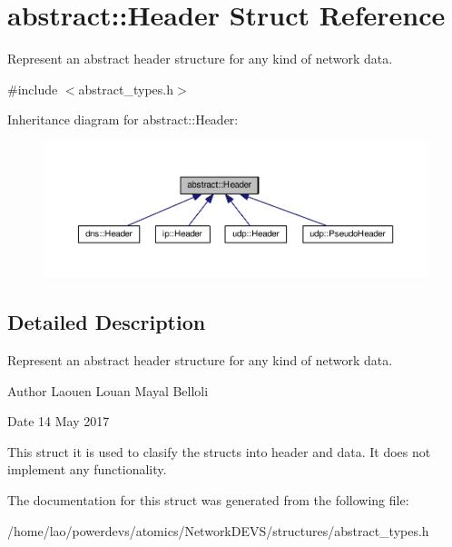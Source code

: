 \hypertarget{structabstract_1_1Header}{}\section{abstract\+:\+:Header Struct Reference}
\label{structabstract_1_1Header}


Represent an abstract header structure for any kind of network data.  




{\ttfamily \#include $<$abstract\+\_\+types.\+h$>$}



Inheritance diagram for abstract\+:\+:Header\+:\nopagebreak
\begin{figure}[H]
\begin{center}
\leavevmode
\includegraphics[width=350pt]{structabstract_1_1Header__inherit__graph}
\end{center}
\end{figure}


\subsection{Detailed Description}
Represent an abstract header structure for any kind of network data. 

\begin{DoxyAuthor}{Author}
Laouen Louan Mayal Belloli 
\end{DoxyAuthor}
\begin{DoxyDate}{Date}
14 May 2017
\end{DoxyDate}
This struct it is used to clasify the structs into header and data. It does not implement any functionality. 

The documentation for this struct was generated from the following file\+:\begin{DoxyCompactItemize}
\item 
/home/lao/powerdevs/atomics/\+Network\+D\+E\+V\+S/structures/abstract\+\_\+types.\+h\end{DoxyCompactItemize}
